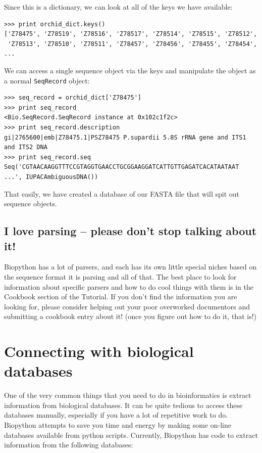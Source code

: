 \documentclass{report}
\begin{document}
Since this is a dictionary, we can look at all of the keys we have available:

\begin{verbatim}
>>> print orchid_dict.keys()
['Z78475', 'Z78519', 'Z78516', 'Z78517', 'Z78514', 'Z78515', 'Z78512', 
 'Z78513', 'Z78510', 'Z78511', 'Z78457', 'Z78456', 'Z78455', 'Z78454', 
...
\end{verbatim} 

We can access a single sequence object via the keys and manipulate the object as a normal \verb|SeqRecord| object:

\begin{verbatim}
>>> seq_record = orchid_dict['Z78475']
>>> print seq_record
<Bio.SeqRecord.SeqRecord instance at 0x102c1f2c>
>>> print seq_record.description
gi|2765600|emb|Z78475.1|PSZ78475 P.supardii 5.8S rRNA gene and ITS1 and ITS2 DNA
>>> print seq_record.seq
Seq('CGTAACAAGGTTTCCGTAGGTGAACCTGCGGAAGGATCATTGTTGAGATCACATAATAAT ...', IUPACAmbiguousDNA())
\end{verbatim}

That easily, we have created a database of our FASTA file that will spit out sequence objects. 


\subsection{I love parsing -- please don't stop talking about it!}

Biopython has a lot of parsers, and each has its own little special niches based on the sequence format it is parsing and all of that. The best place to look for information about specific parsers and how to do cool things with them is in the Cookbook section of the Tutorial. If you don't find the information you are looking for, please consider helping out your poor overworked documentors and submitting a cookbook entry about it! (once you figure out how to do it, that is!)


\section{Connecting with biological databases}

One of the very common things that you need to do in bioinformatics is extract information from biological databases. It can be quite tedious to access these databases manually, especially if you have a lot of repetitive work to do. Biopython attempts to save you time and energy by making some on-line databases available from python scripts. Currently, Biopython has code to extract information from the following databases:
\end{document}

